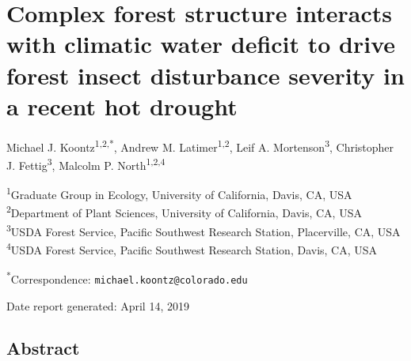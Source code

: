 \documentclass[]{article}
\title{}
\author{}
\date{}
\begin{document}
\section{Complex forest structure interacts with climatic water deficit
to drive forest insect disturbance severity in a recent hot
drought}\label{complex-forest-structure-interacts-with-climatic-water-deficit-to-drive-forest-insect-disturbance-severity-in-a-recent-hot-drought}

Michael J. Koontz\textsuperscript{1,2,*}, Andrew M.
Latimer\textsuperscript{1,2}, Leif A. Mortenson\textsuperscript{3},
Christopher J. Fettig\textsuperscript{3}, Malcolm P.
North\textsuperscript{1,2,4}

\textsuperscript{1}Graduate Group in Ecology, University of California,
Davis, CA, USA\\
\textsuperscript{2}Department of Plant Sciences, University of
California, Davis, CA, USA\\
\textsuperscript{3}USDA Forest Service, Pacific Southwest Research
Station, Placerville, CA, USA\\
\textsuperscript{4}USDA Forest Service, Pacific Southwest Research
Station, Davis, CA, USA

\textsuperscript{*}Correspondence: \texttt{michael.koontz@colorado.edu}

Date report generated: April 14, 2019

\subsection{Abstract}\label{abstract}
\end{document}

